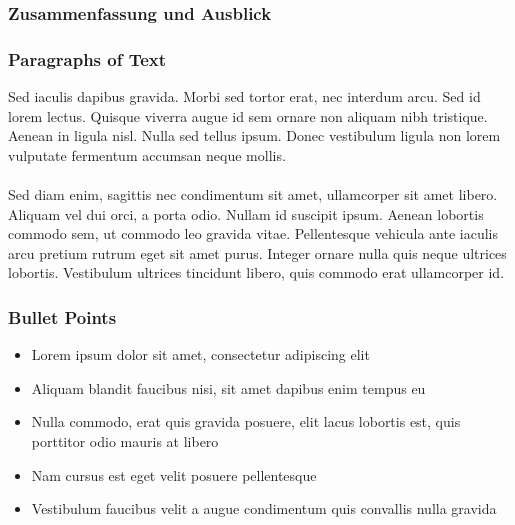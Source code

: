 \documentclass{beamer}
\begin{document}
\begin{frame}
	\frametitle{Zusammenfassung und Ausblick}
\end{frame}


\begin{frame}
	\frametitle{Paragraphs of Text}
	Sed iaculis dapibus gravida. Morbi sed tortor erat, nec interdum arcu. Sed id lorem lectus. Quisque viverra augue id sem ornare non aliquam nibh tristique. Aenean in ligula nisl. Nulla sed tellus ipsum. Donec vestibulum ligula non lorem vulputate fermentum accumsan neque mollis.\\~\\
	
	Sed diam enim, sagittis nec condimentum sit amet, ullamcorper sit amet libero. Aliquam vel dui orci, a porta odio. Nullam id suscipit ipsum. Aenean lobortis commodo sem, ut commodo leo gravida vitae. Pellentesque vehicula ante iaculis arcu pretium rutrum eget sit amet purus. Integer ornare nulla quis neque ultrices lobortis. Vestibulum ultrices tincidunt libero, quis commodo erat ullamcorper id.
\end{frame}

\begin{frame}
	\frametitle{Bullet Points}
	\begin{itemize}
		\item Lorem ipsum dolor sit amet, consectetur adipiscing elit
		\item Aliquam blandit faucibus nisi, sit amet dapibus enim tempus eu
		\item Nulla commodo, erat quis gravida posuere, elit lacus lobortis est, quis porttitor odio mauris at libero
		\item Nam cursus est eget velit posuere pellentesque
		\item Vestibulum faucibus velit a augue condimentum quis convallis nulla gravida
	\end{itemize}
\end{frame}
\end{document}
